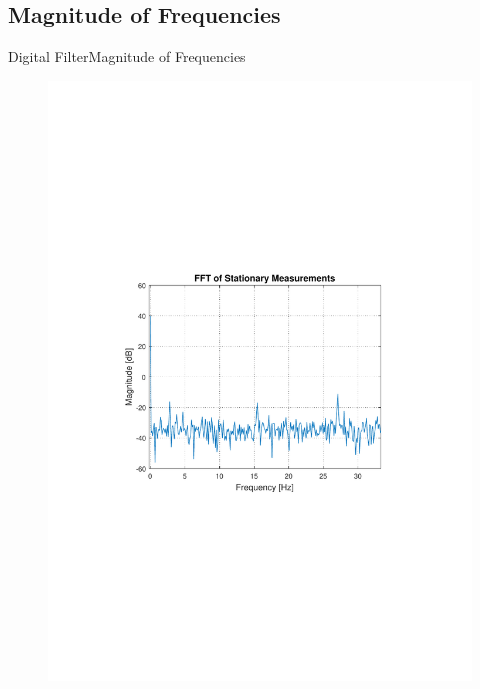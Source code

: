 \subsection{Magnitude of Frequencies}
\begin{frame}{Digital Filter}{Magnitude of Frequencies}
\vspace{-4cm}
  \begin{figure}
  \hspace{-.8cm}
    	\includegraphics[scale = .5]{Pictures/FFTofStationaryMeasurements.pdf}
  \end{figure}
\end{frame}

